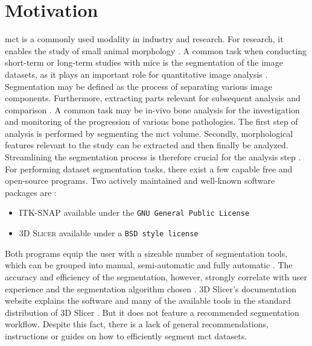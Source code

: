 \section{Motivation}\label{s:introduction-motivation}
\acrfull{mct} is a commonly used modality in industry and research.
For research, it enables the study of small animal morphology \cite{percianoInsight3DMicroCT2017}.
A common task when conducting short-term or long-term studies with mice is the segmentation of the image datasets, as it plays an important role for quantitative image analysis \cite{sheppardTechniquesHelicalScanning2014}.
Segmentation may be defined as the process of separating various image components.
Furthermore, extracting parts relevant for subsequent analysis and comparison \cite{percianoInsight3DMicroCT2017}.
A common task may be in-vivo bone analysis for the investigation and monitoring of the progression of various bone pathologies.
The first step of analysis is performed by segmenting the \acrshort{mct} volume.
Secondly, morphological features relevant to the study can be extracted and then finally be analyzed.
Streamlining the segmentation process is therefore crucial for the analysis step \cite{percianoInsight3DMicroCT2017,korfiatisIndependentActiveContours2017}.
\newline
For performing \mct\space dataset segmentation tasks, there exist a few capable free and open-source programs.
Two actively maintained and well-known software packages are \cite{virziComprehensiveReview3D2020,mandoliniComparisonThree3D2022,virziComprehensiveReview3D2020}:
\begin{itemize}
	\item \textsc{ITK-SNAP} \cite{yushkevichUserguided3DActive2006} available under the \texttt{GNU General Public License} \cite{licenseGnuGeneralPublic1989}
	\item \textsc{3D Slicer} \cite{kikinis3DSlicerPlatform2014} available under a \texttt{BSD style license} \cite{gaudeulPublicProvisionPrivate2005}
\end{itemize}
Both programs equip the user with a sizeable number of segmentation tools, which can be grouped into manual, semi-automatic and fully automatic \cite{percianoInsight3DMicroCT2017}.
The accuracy and efficiency of the segmentation, however, strongly correlate with user experience and the segmentation algorithm chosen \cite{mandoliniComparisonThree3D2022,aydinRELIABILITYREPRODUCIBILITYTIMEEFFICIENCY2020,arguelloComparisonSegmentationTools2019}.
3D Slicer's documentation website explains the software and many of the available tools in the standard distribution of 3D Slicer \cite{pinterPolymorphSegmentationRepresentation2019}.
But it does not feature a recommended segmentation workflow.
Despite this fact, there is a lack of general recommendations, instructions or guides on how to efficiently segment \acrlong{mct} datasets.

